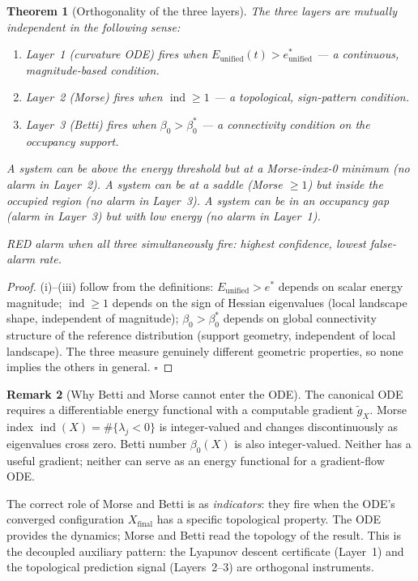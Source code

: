 \documentclass[11pt,a4paper]{article}
\newtheorem{theorem}{Theorem}[section]
\theoremstyle{definition}
\newtheorem{remark}[theorem]{Remark}
\begin{document}
\begin{theorem}[Orthogonality of the three layers]
\label{thm:layer_orthogonality}
The three layers are mutually independent in the following sense:
\begin{enumerate}[label=(\roman*)]
\item Layer~1 (curvature ODE) fires when $E_\mathrm{unified}(t) > e^*_\mathrm{unified}$
  --- a continuous, magnitude-based condition.
\item Layer~2 (Morse) fires when $\operatorname{ind} \geq 1$
  --- a topological, sign-pattern condition.
\item Layer~3 (Betti) fires when $\beta_0 > \beta_0^*$
  --- a connectivity condition on the occupancy support.
\end{enumerate}
A system can be above the energy threshold but at a Morse-index-0 minimum
(no alarm in Layer~2).
A system can be at a saddle (Morse $\geq 1$) but inside the occupied region
(no alarm in Layer~3).
A system can be in an occupancy gap (alarm in Layer~3) but with low energy
(no alarm in Layer~1).

RED alarm when all three simultaneously fire: highest confidence, lowest false-alarm rate.
\end{theorem}

\begin{proof}
(i)--(iii) follow from the definitions: $E_\mathrm{unified} > e^*$ depends on
scalar energy magnitude; $\operatorname{ind} \geq 1$ depends on the sign of
Hessian eigenvalues (local landscape shape, independent of magnitude);
$\beta_0 > \beta_0^*$ depends on global connectivity structure
of the reference distribution (support geometry, independent of local landscape).
The three measure genuinely different geometric properties,
so none implies the others in general. $\square$
\end{proof}

\begin{remark}[Why Betti and Morse cannot enter the ODE]
The canonical ODE requires a differentiable energy functional with
a computable gradient $\tilde g_X$.
Morse index $\operatorname{ind}(X) = \#\{\lambda_j < 0\}$ is integer-valued
and changes discontinuously as eigenvalues cross zero.
Betti number $\beta_0(X)$ is also integer-valued.
Neither has a useful gradient; neither can serve as an energy functional
for a gradient-flow ODE.

The correct role of Morse and Betti is as \emph{indicators}:
they fire when the ODE's converged configuration $X_\mathrm{final}$
has a specific topological property.
The ODE provides the dynamics; Morse and Betti read the topology
of the result.
This is the decoupled auxiliary pattern:
the Lyapunov descent certificate (Layer~1) and the
topological prediction signal (Layers~2--3) are orthogonal instruments.
\end{remark}
\end{document}
